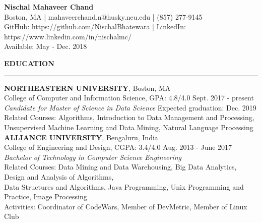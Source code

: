 \documentclass[a4paper]{article}
\newcommand{\myline}{\par
  \kern2pt %
  \hrule height 0.5pt
  \kern2pt %
}
\begin{document}
	\begin{center}
		{\Large \textbf{Nischal Mahaveer Chand}} \\
		Boston, MA | mahaveerchand.n@husky.neu.edu | (857) 277-9145 \\
                GitHub: https://github.com/NischalBhatewara | 
                LinkedIn: https://www.linkedin.com/in/nischalmc/\\
		Available: May - Dec. 2018 \\
	\end{center}
	
	\noindent
	{\large \textbf{EDUCATION}}
	\myline 
	\smallskip
	
	\noindent
	\textbf{NORTHEASTERN UNIVERSITY}, Boston, MA \\
	College of Computer and Information Science, GPA: 4.8/4.0 
        \hfill Sept. 2017 - present \\
	\textit{Candidate for Master of Science in Data Science} 
        \hfill Expected graduation: Dec. 2019 \\
        Related Courses: Algorithms, Introduction to Data Management and Processing, \\
        \hspace*{23.9mm} Unsupervised Machine Learning and Data Mining, 
        Natural Language Processing \\
	
	\noindent
	\textbf{ALLIANCE UNIVERSITY}, Bengaluru, India \\
	College of Engineering and Design, CGPA: 3.4/4.0 \hfill Aug. 2013 - June 2017 \\
	\textit{Bachelor of Technology in Computer Science Engineering} \\
	Related Courses: 
                                    Data Mining and Data Warehousing,
                                    Big Data Analytics, 
                                    Design and Analysis of Algorithms, 
                                    \\ \hspace*{23.9mm}
                                    Data Structures and Algorithms, 
                                    Java Programming, 
                                    Unix Programming and Practice, 
                                    Image Processing
                                    \\
	Activities: Coordinator of CodeWars, Member of DevMetric, Member of Linux 
        Club \\
	
\end{document}
